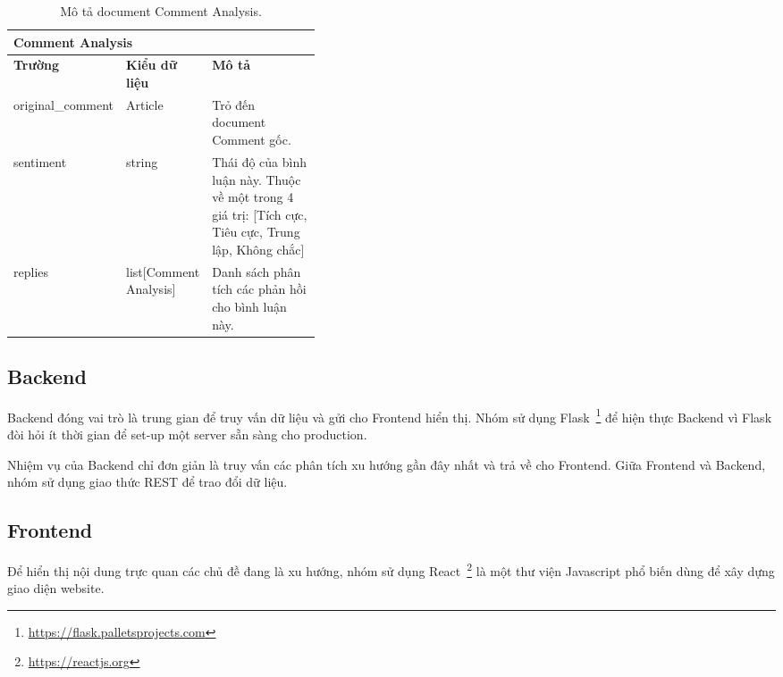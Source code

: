 \begin{table}[ht!]
    \centering
\begin{tabular}{|llp{0.4\linewidth}|}
\hline
\multicolumn{3}{|l|}{\textbf{Comment Analysis}}                                                                                                                                                            \\ \hline
\multicolumn{1}{|l|}{\textbf{Trường}}   & \multicolumn{1}{l|}{\textbf{Kiểu dữ liệu}}        & \textbf{Mô   tả}                                                                                             \\ \hline
\multicolumn{1}{|l|}{original\_comment} & \multicolumn{1}{l|}{Article}                      & Trỏ   đến document Comment gốc.                                                                              \\ \hline
\multicolumn{1}{|l|}{sentiment}         & \multicolumn{1}{l|}{string}                       & Thái   độ của bình luận này. Thuộc về một trong 4 giá trị: {[}Tích cực, Tiêu cực,   Trung lập, Không chắc{]} \\ \hline
\multicolumn{1}{|l|}{replies}           & \multicolumn{1}{l|}{list{[}Comment   Analysis{]}} & Danh   sách phân tích các phản hồi cho bình luận này.                                                        \\ \hline
\end{tabular}
    \caption{Mô tả document Comment Analysis.}
    \label{table:schema-comment-analysis}
\end{table}

\subsection{Backend}
Backend đóng vai trò là trung gian để truy vấn dữ liệu và gửi cho Frontend hiển thị. Nhóm sử dụng Flask~\footnote{\url{https://flask.palletsprojects.com}} để hiện thực Backend vì Flask đòi hỏi ít thời gian để set-up một server sẵn sàng cho production.

Nhiệm vụ của Backend chỉ đơn giản là truy vấn các phân tích xu hướng gần đây nhất và trả về cho Frontend. Giữa Frontend và Backend, nhóm sử dụng giao thức REST để trao đổi dữ liệu.

\subsection{Frontend}
Để hiển thị nội dung trực quan các chủ đề đang là xu hướng, nhóm sử dụng React~\footnote{\url{https://reactjs.org}} là một thư viện Javascript phổ biến dùng để xây dựng giao diện website.

